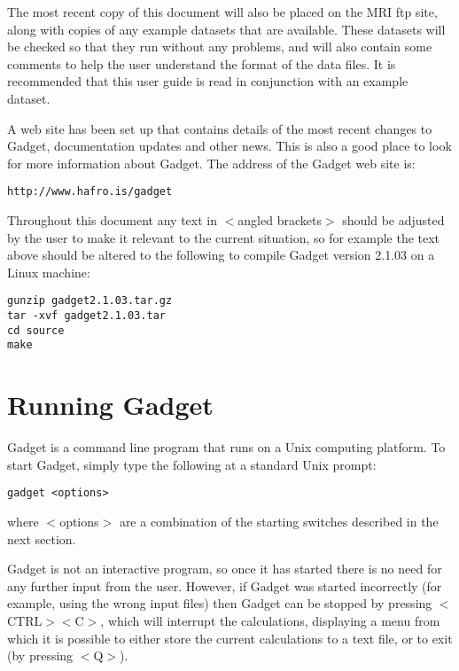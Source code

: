 \documentclass[10pt,twoside]{book}
\begin{document}
The most recent copy of this document will also be placed on the MRI ftp site, along with copies of any example datasets that are available.  These datasets will be checked so that they run without any problems, and will also contain some comments to help the user understand the format of the data files.  It is recommended that this user guide is read in conjunction with an example dataset.

\bigskip
A web site has been set up that contains details of the most recent changes to Gadget, documentation updates and other news.  This is also a good place to look for more information about Gadget.  The address of the Gadget web site is:

{\small\begin{verbatim}
http://www.hafro.is/gadget
\end{verbatim}}

Throughout this document any text in $<$angled brackets$>$ should be adjusted by the user to make it relevant to the current situation, so for example the text above should be altered to the following to compile Gadget version 2.1.03 on a Linux machine:

{\small\begin{verbatim}
gunzip gadget2.1.03.tar.gz
tar -xvf gadget2.1.03.tar
cd source
make
\end{verbatim}}

\section{Running Gadget}\label{sec:runninggadget}
Gadget is a command line program that runs on a Unix computing platform.  To start Gadget, simply type the following at a standard Unix prompt:

{\small\begin{verbatim}
gadget <options>
\end{verbatim}}

where $<$options$>$ are a combination of the starting switches described in the next section.

\bigskip
Gadget is not an interactive program, so once it has started there is no need for any further input from the user.  However, if Gadget was started incorrectly (for example, using the wrong input files) then Gadget can be stopped by pressing $<$CTRL$><$C$>$, which will interrupt the calculations, displaying a menu from which it is possible to either store the current calculations to a text file, or to exit (by pressing $<$Q$>$).
\end{document}
